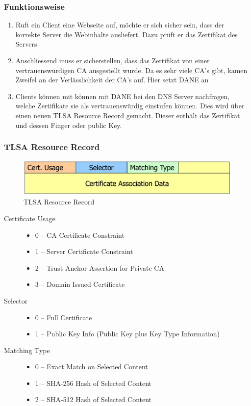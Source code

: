 \subsubsection{Funktionsweise}
\begin{enumerate}
	\item Ruft ein Client eine Webseite auf, möchte er sich sicher sein, dass der korrekte Server die Webinhalte ausliefert. Dazu prüft er das Zertifikat des Servers
	\item Anschliessend muss er sicherstellen, dass das Zertifikat von einer vertrauenswürdigen CA ausgestellt wurde. Da es sehr viele CA's gibt, kamen Zweifel an der Verlässlichkeit der CA's auf. Hier setzt DANE an
	\item Clients können mit können mit DANE bei den DNS Server nachfragen, welche Zertifikate sie als vertrauenswürdig einstufen können. Dies wird über einen neuen TLSA Resource Record gemacht. Dieser enthält das Zertifikat und dessen Finger oder public Key. 
\end{enumerate}


\subsubsection{TLSA Resource Record}
\begin{figure}[h]
\centering
\includegraphics[width=0.7\linewidth]{images/tlsa_resource_record}
\caption{TLSA Resource Record}
\label{fig:tlsaresourcerecord}
\end{figure}

\begin{description}
	\item[Certificate Usage] \hfill
	\begin{itemize}
		\item 0 – CA Certificate Constraint
		\item 1 – Server Certificate Constraint
		\item 2 – Trust Anchor Assertion for Private CA
		\item 3 – Domain Issued Certificate
	\end{itemize}
	\item[Selector] \hfill
	\begin{itemize}
		\item 0 – Full Certificate
		\item 1 – Public Key Info (Public Key plus Key Type Information)
	\end{itemize}
	\item[Matching Type] \hfill
	\begin{itemize}
		\item 0 – Exact Match on Selected Content
		\item 1 – SHA-256 Hash of Selected Content
		\item 2 – SHA-512 Hash of Selected Content
	\end{itemize}
\end{description}

